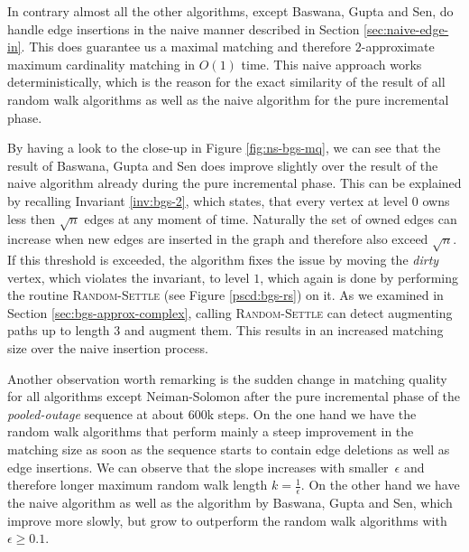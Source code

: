 \documentclass{article}      %
\begin{document}
In contrary almost all the other algorithms, except Baswana, Gupta and Sen, do handle edge insertions in the naive manner described in Section \ref{sec:naive-edge-in}. This does guarantee us a maximal matching and therefore $2$-approximate maximum cardinality matching in $O(1)$ time. This naive approach works deterministically, which is the reason for the exact similarity of the result of all random walk algorithms as well as the naive algorithm for the pure incremental phase.

By having a look to the close-up in Figure \ref{fig:ns-bgs-mq}, we can see that the result of Baswana, Gupta and Sen does improve slightly over the result of the naive algorithm already during the pure incremental phase. This can be explained by recalling Invariant \ref{inv:bgs-2}, which states, that every vertex at level $0$ owns less then $\sqrt{n}$ edges at any moment of time. Naturally the set of owned edges can increase when new edges are inserted in the graph and therefore also exceed $\sqrt{n}$. If this threshold is exceeded, the algorithm fixes the issue by moving the \emph{dirty} vertex, which violates the invariant, to level $1$, which again is done by performing the routine \textsc{Random-Settle} (see Figure \ref{pscd:bgs-rs}) on it. As we examined in Section \ref{sec:bgs-approx-complex}, calling \textsc{Random-Settle} can detect augmenting paths up to length $3$ and augment them. This results in an increased matching size over the naive insertion process.

\bigskip \noindent
Another observation worth remarking is the sudden change in matching quality for all algorithms except Neiman-Solomon after the pure incremental phase of the \emph{pooled-outage} sequence at about $600$k steps. On the one hand we have the random walk algorithms that perform mainly a steep improvement in the matching size as soon as the sequence starts to contain edge deletions as well as edge insertions. We can observe that the slope increases with smaller~$\epsilon$ and therefore longer maximum random walk length $k=\frac{1}{\epsilon}$. On the other hand we have the naive algorithm as well as the algorithm by Baswana, Gupta and Sen, which improve more slowly, but grow to outperform the random walk algorithms with $\epsilon \geq 0.1$.
\end{document}
